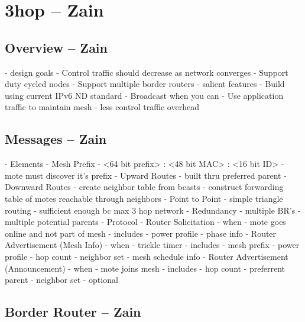 \section{3hop -- Zain}

\subsection{Overview -- Zain}
- design goals
	- Control traffic should decrease as network converges
	- Support duty cycled nodes
	- Support multiple border routers
- salient features
	- Build using current IPv6 ND standard
	- Broadcast when you can
	- Use application traffic to maintain mesh
	- less control traffic overhead
\fi

\subsection{Messages -- Zain}
- Elements
	- Mesh Prefix
		- <64 bit prefix> : <48 bit MAC> : <16 bit ID>
		- mote must discover it's prefix
	- Upward Routes
		- built thru preferred parent
	- Downward Routes
		- create neighbor table from bcasts
		- construct forwarding table of motes reachable through neighbors
	- Point to Point
		- simple triangle routing
		- sufficient enough bc max 3 hop network
	- Redundancy
		- multiple BR's
		- multiple potential parents
- Protocol
	- Router Solicitation
		- when
			- mote goes online and not part of mesh
		- includes
			- power profile
			- phase info
	- Router Advertisement (Mesh Info)
		- when
			- trickle timer
		- includes
			- mesh prefix
			- power profile
			- hop count
			- neighbor set
			- mesh schedule info
	- Router Advertisement (Announcement)
		- when
			- mote joins mesh
		- includes
			- hop count
			- preferrent parent
			- neighbor set
		- optional
\fi

\subsection{Border Router -- Zain}
